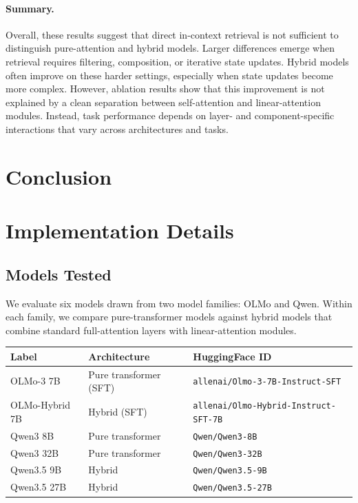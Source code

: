 \documentclass{article}
\begin{document}
\paragraph{Summary.}
Overall, these results suggest that direct in-context retrieval is not sufficient to distinguish pure-attention and hybrid models.
Larger differences emerge when retrieval requires filtering, composition, or iterative state updates.
Hybrid models often improve on these harder settings, especially when state updates become more complex.
However, ablation results show that this improvement is not explained by a clean separation between self-attention and linear-attention modules.
Instead, task performance depends on layer- and component-specific interactions that vary across architectures and tasks.
\section{Conclusion}




{
\small


}
\small


\clearpage
\appendix
\renewcommand{\thefigure}{A.\arabic{figure}}
\setcounter{figure}{0}

\renewcommand{\thetable}{A.\arabic{table}}
\setcounter{table}{0}

\section{Implementation Details}

\subsection{Models Tested}
We evaluate six models drawn from two model families: OLMo and Qwen. Within each family, we compare pure-transformer models against hybrid models that combine standard full-attention layers with linear-attention modules.

\begin{center}
\begin{tabular}{lll}
\toprule
\textbf{Label} & \textbf{Architecture} & \textbf{HuggingFace ID} \\
\midrule
OLMo-3 7B      & Pure transformer (SFT) & \texttt{allenai/Olmo-3-7B-Instruct-SFT} \\
OLMo-Hybrid 7B & Hybrid (SFT) & \texttt{allenai/Olmo-Hybrid-Instruct-SFT-7B} \\
Qwen3 8B       & Pure transformer & \texttt{Qwen/Qwen3-8B} \\
Qwen3 32B      & Pure transformer & \texttt{Qwen/Qwen3-32B} \\
Qwen3.5 9B     & Hybrid & \texttt{Qwen/Qwen3.5-9B} \\
Qwen3.5 27B    & Hybrid & \texttt{Qwen/Qwen3.5-27B} \\
\bottomrule
\end{tabular}
\end{center}
\end{document}
